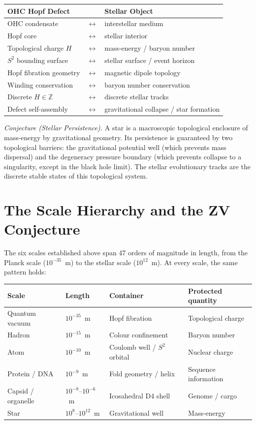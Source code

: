 \documentclass[aps,prl,preprint,superscriptaddress,floatfix]{revtex4-2}
\begin{document}
\begin{center}
\begin{tabular}{lll}
\toprule
OHC Hopf Defect & & Stellar Object \\
\midrule
OHC condensate & $\leftrightarrow$ & interstellar medium \\
Hopf core & $\leftrightarrow$ & stellar interior \\
Topological charge $H$ & $\leftrightarrow$ & mass-energy / baryon number \\
$S^2$ bounding surface & $\leftrightarrow$ & stellar surface / event horizon \\
Hopf fibration geometry & $\leftrightarrow$ & magnetic dipole topology \\
Winding conservation & $\leftrightarrow$ & baryon number conservation \\
Discrete $H \in \mathbb{Z}$ & $\leftrightarrow$ & discrete stellar tracks \\
Defect self-assembly & $\leftrightarrow$ & gravitational collapse / star formation \\
\bottomrule
\end{tabular}
\end{center}

\textit{Conjecture (Stellar Persistence).} A star is a macroscopic
topological enclosure of mass-energy by gravitational geometry.
Its persistence is guaranteed by two topological barriers: the
gravitational potential well (which prevents mass dispersal) and
the degeneracy pressure boundary (which prevents collapse to
a singularity, except in the black hole limit). The stellar
evolutionary tracks are the discrete stable states of this
topological system.

\section{The Scale Hierarchy and the ZV Conjecture}

The six scales established above span 47 orders of magnitude in
length, from the Planck scale ($10^{-35}$~m) to the stellar scale
($10^{12}$~m). At every scale, the same pattern holds:

\begin{center}
\begin{tabular}{llll}
\toprule
Scale & Length & Container & Protected quantity \\
\midrule
Quantum vacuum & $10^{-35}$~m & Hopf fibration & Topological charge \\
Hadron & $10^{-15}$~m & Colour confinement & Baryon number \\
Atom & $10^{-10}$~m & Coulomb well / $S^2$ orbital & Nuclear charge \\
Protein / DNA & $10^{-9}$~m & Fold geometry / helix & Sequence information \\
Capsid / organelle & $10^{-8}$--$10^{-6}$~m & Icosahedral D4 shell & Genome / cargo \\
Star & $10^{8}$--$10^{12}$~m & Gravitational well & Mass-energy \\
\bottomrule
\end{tabular}
\end{center}
\end{document}
